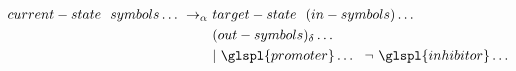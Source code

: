 \begin{framed}
\vspace{-0.6cm}
\begin{align*}
 current-state  ~~  symbols  \dots ~ \rightarrow_\alpha ~ &  target-state  ~~ ( in-symbols ) \dots ~~ \\
 & ( out-symbols )_\delta \dots \\
 & | ~  \glspl{promoter} \dots ~~ \neg ~  \glspl{inhibitor} \dots
\end{align*}
\vspace{-0.8cm}
\end{framed}







